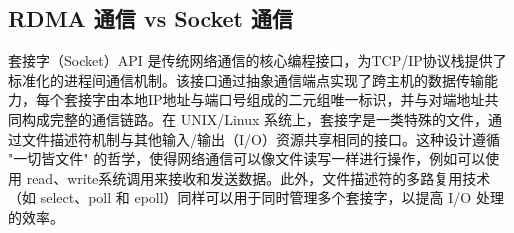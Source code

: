 {%

\subsection{RDMA 通信 vs Socket 通信}
套接字（Socket）API 是传统网络通信的核心编程接口，为TCP/IP协议栈提供了标准化的进程间通信机制。该接口通过抽象通信端点实现了跨主机的数据传输能力，每个套接字由本地IP地址与端口号组成的二元组唯一标识，并与对端地址共同构成完整的通信链路。在 UNIX/Linux 系统上，套接字是一类特殊的文件，通过文件描述符机制与其他输入/输出（I/O）资源共享相同的接口。这种设计遵循 "一切皆文件" 的哲学，使得网络通信可以像文件读写一样进行操作，例如可以使用 read、write系统调用来接收和发送数据。此外，文件描述符的多路复用技术（如 select、poll 和 epoll）同样可以用于同时管理多个套接字，以提高 I/O 处理的效率。

}
